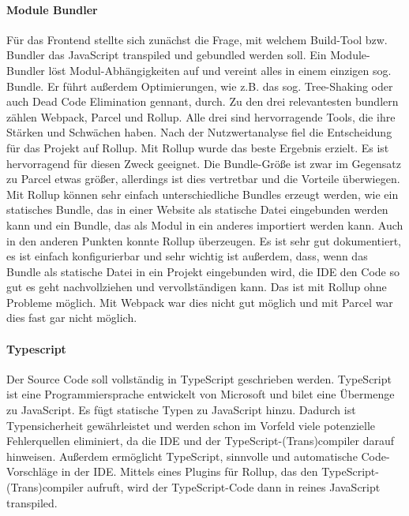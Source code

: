 \paragraph{Module Bundler} Für das Frontend stellte sich zunächst die Frage, mit welchem Build-Tool bzw. Bundler das JavaScript transpiled und gebundled werden soll. Ein Module-Bundler löst Modul-Abhängigkeiten auf und vereint alles in einem einzigen sog. Bundle. Er führt außerdem Optimierungen, wie z.B. das sog. Tree-Shaking oder auch Dead Code Elimination gennant, durch. Zu den drei relevantesten bundlern zählen Webpack, Parcel und Rollup. Alle drei sind hervorragende Tools, die ihre Stärken und Schwächen haben. Nach der Nutzwertanalyse fiel die Entscheidung für das Projekt auf Rollup. Mit Rollup wurde das beste Ergebnis erzielt. Es ist hervorragend für diesen Zweck geeignet. Die Bundle-Größe ist zwar im Gegensatz zu Parcel etwas größer, allerdings ist dies vertretbar und die Vorteile überwiegen. Mit Rollup können sehr einfach unterschiedliche Bundles erzeugt werden, wie ein statisches Bundle, das in einer Website als statische Datei eingebunden werden kann und ein Bundle, das als Modul in ein anderes importiert werden kann. Auch in den anderen Punkten konnte Rollup überzeugen. Es ist sehr gut dokumentiert, es ist einfach konfigurierbar und sehr wichtig ist außerdem, dass, wenn das Bundle als statische Datei in ein Projekt eingebunden wird, die IDE den Code so gut es geht nachvollziehen und vervollständigen kann. Das ist mit Rollup ohne Probleme möglich. Mit Webpack war dies nicht gut möglich und mit Parcel war dies fast gar nicht möglich. 


\paragraph{Typescript} Der Source Code soll vollständig in TypeScript geschrieben werden. TypeScript ist eine Programmiersprache entwickelt von Microsoft und bilet eine Übermenge zu JavaScript. Es fügt statische Typen zu JavaScript hinzu. Dadurch ist Typensicherheit gewährleistet und werden schon im Vorfeld viele potenzielle Fehlerquellen eliminiert, da die IDE und der TypeScript-(Trans)compiler darauf hinweisen. Außerdem ermöglicht TypeScript, sinnvolle und automatische Code-Vorschläge in der IDE. 
Mittels eines Plugins für Rollup, das den TypeScript-(Trans)compiler aufruft, wird der TypeScript-Code dann in reines JavaScript transpiled. 


